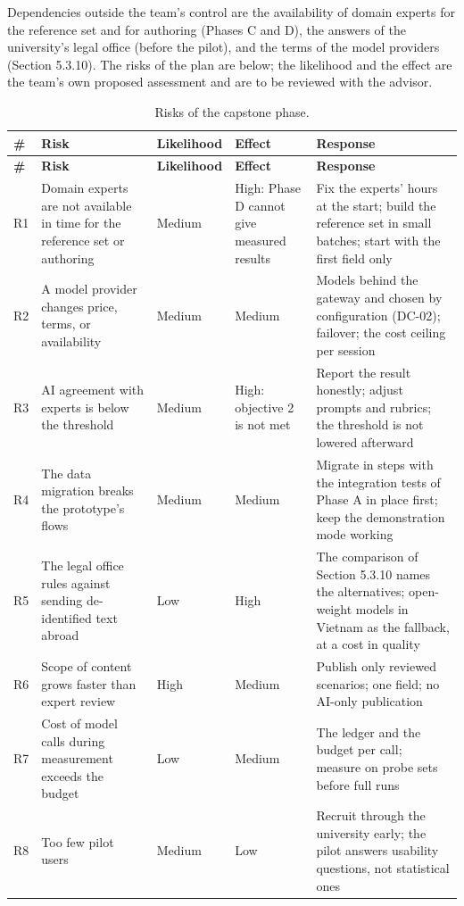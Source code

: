 Dependencies outside the team's control are the availability of domain experts for the reference set and for authoring (Phases C and D), the answers of the university's legal office (before the pilot), and the terms of the model providers (Section 5.3.10). The risks of the plan are below; the likelihood and the effect are the team's own proposed assessment and are to be reviewed with the advisor.

{\small{}\renewcommand{\arraystretch}{1.1}
\begin{longtable}{|>{\raggedright\arraybackslash}p{}|>{\raggedright\arraybackslash}p{}|>{\raggedright\arraybackslash}p{}|>{\raggedright\arraybackslash}p{}|>{\raggedright\arraybackslash}p{}|}
\caption{Risks of the capstone phase.} \\
\hline
\textbf{\#} & \textbf{Risk} & \textbf{Likelihood} & \textbf{Effect} & \textbf{Response} \\ \hline
\endfirsthead
\hline
\textbf{\#} & \textbf{Risk} & \textbf{Likelihood} & \textbf{Effect} & \textbf{Response} \\ \hline
\endhead
R1 & Domain experts are not available in time for the reference set or authoring & Medium & High: Phase D cannot give measured results & Fix the experts' hours at the start; build the reference set in small batches; start with the first field only \\ \hline
R2 & A model provider changes price, terms, or availability & Medium & Medium & Models behind the gateway and chosen by configuration (DC-02); failover; the cost ceiling per session \\ \hline
R3 & AI agreement with experts is below the threshold & Medium & High: objective 2 is not met & Report the result honestly; adjust prompts and rubrics; the threshold is not lowered afterward \\ \hline
R4 & The data migration breaks the prototype's flows & Medium & Medium & Migrate in steps with the integration tests of Phase A in place first; keep the demonstration mode working \\ \hline
R5 & The legal office rules against sending de-\allowbreak{}identified text abroad & Low & High & The comparison of Section 5.3.10 names the alternatives; open-weight models in Vietnam as the fallback, at a cost in quality \\ \hline
R6 & Scope of content grows faster than expert review & High & Medium & Publish only reviewed scenarios; one field; no AI-only publication \\ \hline
R7 & Cost of model calls during measurement exceeds the budget & Low & Medium & The ledger and the budget per call; measure on probe sets before full runs \\ \hline
R8 & Too few pilot users & Medium & Low & Recruit through the university early; the pilot answers usability questions, not statistical ones \\ \hline
\end{longtable}
}

